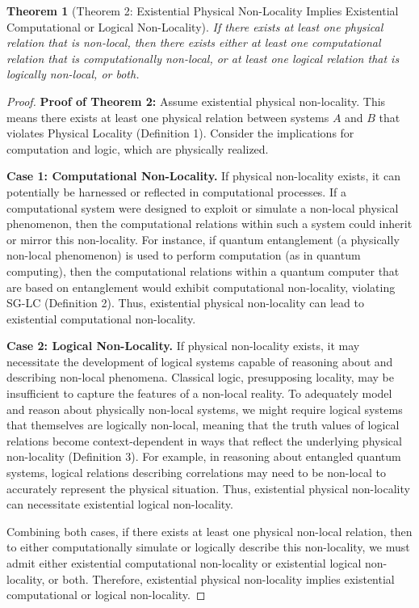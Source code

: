 \documentclass{article}
\newtheorem{theorem}{Theorem}
\begin{document}
	\begin{theorem}[Theorem 2: Existential Physical Non-Locality Implies Existential Computational or Logical Non-Locality]
		If there exists at least one physical relation that is non-local, then there exists either at least one computational relation that is computationally non-local, or at least one logical relation that is logically non-local, or both.
	\end{theorem}
	\begin{proof}
		\textbf{Proof of Theorem 2:} Assume existential physical non-locality. This means there exists at least one physical relation between systems $A$ and $B$ that violates Physical Locality (Definition 1). Consider the implications for computation and logic, which are physically realized.
		
		\textbf{Case 1: Computational Non-Locality.} If physical non-locality exists, it can potentially be harnessed or reflected in computational processes. If a computational system were designed to exploit or simulate a non-local physical phenomenon, then the computational relations within such a system could inherit or mirror this non-locality. For instance, if quantum entanglement (a physically non-local phenomenon) is used to perform computation (as in quantum computing), then the computational relations within a quantum computer that are based on entanglement would exhibit computational non-locality, violating SG-LC (Definition 2). Thus, existential physical non-locality can lead to existential computational non-locality.
		
		\textbf{Case 2: Logical Non-Locality.}  If physical non-locality exists, it may necessitate the development of logical systems capable of reasoning about and describing non-local phenomena. Classical logic, presupposing locality, may be insufficient to capture the features of a non-local reality. To adequately model and reason about physically non-local systems, we might require logical systems that themselves are logically non-local, meaning that the truth values of logical relations become context-dependent in ways that reflect the underlying physical non-locality (Definition 3). For example, in reasoning about entangled quantum systems, logical relations describing correlations may need to be non-local to accurately represent the physical situation. Thus, existential physical non-locality can necessitate existential logical non-locality.
		
		Combining both cases, if there exists at least one physical non-local relation, then to either computationally simulate or logically describe this non-locality, we must admit either existential computational non-locality or existential logical non-locality, or both. Therefore, existential physical non-locality implies existential computational or logical non-locality.
	\end{proof}
	
\end{document}
